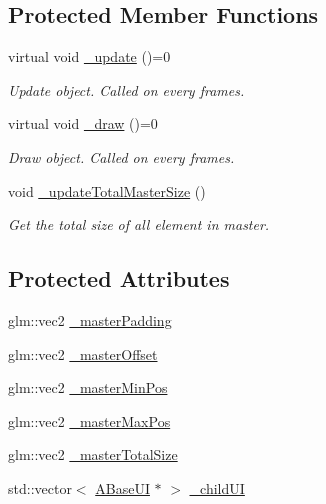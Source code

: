 \subsection*{Protected Member Functions}
\begin{DoxyCompactItemize}
\item 
virtual void \hyperlink{class_a_base_master_u_i_a6c18f89d96c65d68ee1eabd8d4e1ee19}{\+\_\+update} ()=0
\begin{DoxyCompactList}\small\item\em Update object. Called on every frames. \end{DoxyCompactList}\item 
virtual void \hyperlink{class_a_base_master_u_i_ae92346a217da747e894a8acbe39b4397}{\+\_\+draw} ()=0
\begin{DoxyCompactList}\small\item\em Draw object. Called on every frames. \end{DoxyCompactList}\item 
void \hyperlink{class_a_base_master_u_i_a2bb6ad21838a1a2e1ce0bf7fb24a3330}{\+\_\+update\+Total\+Master\+Size} ()
\begin{DoxyCompactList}\small\item\em Get the total size of all element in master. \end{DoxyCompactList}\end{DoxyCompactItemize}
\subsection*{Protected Attributes}
\begin{DoxyCompactItemize}
\item 
glm\+::vec2 \hyperlink{class_a_base_master_u_i_a381f24b69a5c92d1363fa855ed972e76}{\+\_\+master\+Padding}
\item 
glm\+::vec2 \hyperlink{class_a_base_master_u_i_a1f41b39f793a657af383ca420ca2a39b}{\+\_\+master\+Offset}
\item 
glm\+::vec2 \hyperlink{class_a_base_master_u_i_a9d907edd4ba081a74108846d1921908a}{\+\_\+master\+Min\+Pos}
\item 
glm\+::vec2 \hyperlink{class_a_base_master_u_i_a2a882142b0df3f748eef03dad099fc9c}{\+\_\+master\+Max\+Pos}
\item 
glm\+::vec2 \hyperlink{class_a_base_master_u_i_a1f2c4794773a4a3dcc00bd2871756898}{\+\_\+master\+Total\+Size}
\item 
std\+::vector$<$ \hyperlink{class_a_base_u_i}{A\+Base\+UI} $\ast$ $>$ \hyperlink{class_a_base_master_u_i_a8e67f5e6780889a29464f301f8d53e9a}{\+\_\+child\+UI}
\end{DoxyCompactItemize}

